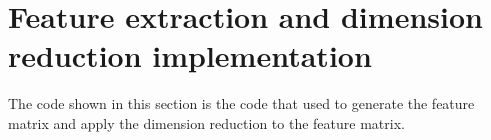 \chapter{Feature extraction and dimension reduction implementation}
The code shown in this section is the code that used to generate the feature matrix and apply the dimension reduction to the feature matrix.\\


